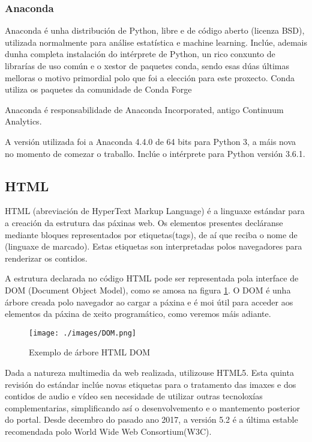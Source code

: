 \subsubsection{Anaconda}

Anaconda é unha distribución de Python, libre e de código aberto (licenza BSD), utilizada normalmente para análise estatística e machine learning. Inclúe, ademais dunha completa instalación do intérprete de Python, un rico conxunto de librarías de uso común e o xestor de paquetes conda, sendo esas dúas últimas melloras o motivo primordial polo que foi a elección para este proxecto. Conda utiliza os paquetes da comunidade de Conda Forge \cite{anaconda1}

Anaconda é responsabilidade de Anaconda Incorporated, antigo Continuum Analytics.

A versión utilizada foi a Anaconda 4.4.0 de 64 bits para Python 3, a máis nova no momento de comezar o traballo. Inclúe o intérprete para Python versión 3.6.1.


\subsection{HTML}

HTML (abreviación de HyperText Markup Language) é a linguaxe estándar para a creación da estrutura das páxinas web. Os 
elementos presentes decláranse mediante bloques representados por etiquetas(tags), de aí que reciba o nome de
 (linguaxe de marcado). Estas etiquetas son interpretadas polos navegadores para renderizar os 
contidos\cite{html1}. 

A estrutura declarada no código HTML pode ser representada pola interface de DOM (Document Object Model), como se amosa na figura \ref{fig:img_DOM}. O DOM é unha árbore creada polo navegador ao cargar a páxina e é moi útil para acceder aos elementos da páxina de xeito programático, como veremos máis adiante.

\begin{figure}[h]
	\centering
	\texttt{[image: ./images/DOM.png]}
	\caption{Exemplo de árbore HTML DOM\protect\cite{dom}}
	\label{fig:img_DOM}
\end{figure}

Dada a natureza multimedia da web realizada, utilizouse HTML5. Esta quinta revisión do estándar inclúe novas etiquetas 
para o tratamento das imaxes e dos contidos de audio e vídeo sen necesidade de utilizar outras tecnoloxías complementarias, 
simplificando así o desenvolvemento e o mantemento posterior do portal. Desde decembro do pasado ano 2017, a versión 5.2 é a última estable recomendada polo World Wide Web Consortium(W3C)\cite{html_w3c}.

